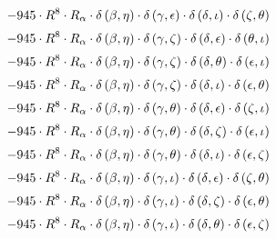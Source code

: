 \begin{subequations}
\begin{gather}
 \\[0.2em] \notag 		 - 945 \cdot R^{8} \cdot R_{\alpha{}} \cdot \delta{}\left(\beta{}, \eta{}\right) \cdot \delta{}\left(\gamma{}, \epsilon{}\right) \cdot \delta{}\left(\delta{}, \iota{}\right) \cdot \delta{}\left(\zeta{}, \theta{}\right) 
 \\[0.2em] \notag 		 - 945 \cdot R^{8} \cdot R_{\alpha{}} \cdot \delta{}\left(\beta{}, \eta{}\right) \cdot \delta{}\left(\gamma{}, \zeta{}\right) \cdot \delta{}\left(\delta{}, \epsilon{}\right) \cdot \delta{}\left(\theta{}, \iota{}\right) 
 \\[0.2em] \notag 		 - 945 \cdot R^{8} \cdot R_{\alpha{}} \cdot \delta{}\left(\beta{}, \eta{}\right) \cdot \delta{}\left(\gamma{}, \zeta{}\right) \cdot \delta{}\left(\delta{}, \theta{}\right) \cdot \delta{}\left(\epsilon{}, \iota{}\right) 
 \\[0.2em] \notag 		 - 945 \cdot R^{8} \cdot R_{\alpha{}} \cdot \delta{}\left(\beta{}, \eta{}\right) \cdot \delta{}\left(\gamma{}, \zeta{}\right) \cdot \delta{}\left(\delta{}, \iota{}\right) \cdot \delta{}\left(\epsilon{}, \theta{}\right) 
 \\[0.2em] \notag 		 - 945 \cdot R^{8} \cdot R_{\alpha{}} \cdot \delta{}\left(\beta{}, \eta{}\right) \cdot \delta{}\left(\gamma{}, \theta{}\right) \cdot \delta{}\left(\delta{}, \epsilon{}\right) \cdot \delta{}\left(\zeta{}, \iota{}\right) 
 \\[0.2em] \notag 		 - 945 \cdot R^{8} \cdot R_{\alpha{}} \cdot \delta{}\left(\beta{}, \eta{}\right) \cdot \delta{}\left(\gamma{}, \theta{}\right) \cdot \delta{}\left(\delta{}, \zeta{}\right) \cdot \delta{}\left(\epsilon{}, \iota{}\right) 
 \\[0.2em] \notag 		 - 945 \cdot R^{8} \cdot R_{\alpha{}} \cdot \delta{}\left(\beta{}, \eta{}\right) \cdot \delta{}\left(\gamma{}, \theta{}\right) \cdot \delta{}\left(\delta{}, \iota{}\right) \cdot \delta{}\left(\epsilon{}, \zeta{}\right) 
 \\[0.2em] \notag 		 - 945 \cdot R^{8} \cdot R_{\alpha{}} \cdot \delta{}\left(\beta{}, \eta{}\right) \cdot \delta{}\left(\gamma{}, \iota{}\right) \cdot \delta{}\left(\delta{}, \epsilon{}\right) \cdot \delta{}\left(\zeta{}, \theta{}\right) 
 \\[0.2em] \notag 		 - 945 \cdot R^{8} \cdot R_{\alpha{}} \cdot \delta{}\left(\beta{}, \eta{}\right) \cdot \delta{}\left(\gamma{}, \iota{}\right) \cdot \delta{}\left(\delta{}, \zeta{}\right) \cdot \delta{}\left(\epsilon{}, \theta{}\right) 
 \\[0.2em] \notag 		 - 945 \cdot R^{8} \cdot R_{\alpha{}} \cdot \delta{}\left(\beta{}, \eta{}\right) \cdot \delta{}\left(\gamma{}, \iota{}\right) \cdot \delta{}\left(\delta{}, \theta{}\right) \cdot \delta{}\left(\epsilon{}, \zeta{}\right) 

\end{gather}
\end{subequations}
